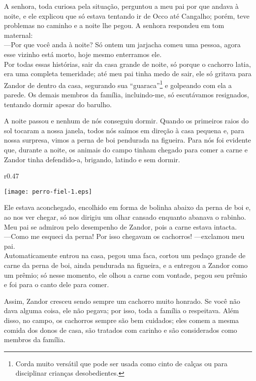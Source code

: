 A senhora, toda curiosa pela situação, perguntou a meu pai por que andava à noite, e ele explicou que só estava tentando ir de Occo até Cangalho; porém, teve problemas no caminho e a noite lhe pegou. 
A senhora respondeu em tom maternal:\\\indent 
---Por que você anda à noite? Só ontem um jarjacha comeu uma pessoa, agora esse vizinho está morto, hoje mesmo enterramos ele.\\\indent
Por todas essas histórias, sair da casa grande de noite, só porque o cachorro latia, era uma completa temeridade; até meu pai tinha medo de sair, ele só gritava para Zandor de dentro da casa, segurando sua ``guaraca''\footnote{Corda muito versátil que pode ser usada como cinto de calças ou para disciplinar crianças desobedientes.} e golpeando com ela a parede. 
Os demais membros da família, incluindo-me, só escutávamos resignados, tentando dormir apesar do barulho.

A noite passou e nenhum de nós conseguiu dormir. 
Quando os primeiros raios do sol tocaram a nossa janela, todos nós saímos em direção à casa pequena e, para nossa surpresa, vimos a perna de boi pendurada na figueira. 
Para nós foi evidente que, durante a noite, os animais do campo tinham chegado para comer a carne e Zandor tinha defendido-a, brigando, latindo e sem dormir.
\ifdefined\EnableIncludeImages 
\begin{wrapfigure}{r}{0.47\textwidth}
  \begin{center}
  \vspace{-0.5cm}
    \texttt{[image: perro-fiel-1.eps]}
  \end{center}
  \vspace{-0.5cm}
\end{wrapfigure}
\fi
Ele estava aconchegado, encolhido em forma de bolinha abaixo da perna de boi e, ao nos ver chegar, só nos dirigiu um olhar cansado enquanto abanava o rabinho. Meu pai se admirou pelo desempenho de Zandor, pois a carne estava intacta.\\\indent
---Como me esqueci da perna! Por isso chegavam os cachorros! ---exclamou meu pai.\\\indent
Automaticamente entrou na casa, pegou uma faca, cortou um pedaço grande de carne da perna de boi, ainda pendurada na figueira, e a entregou a Zandor como um prêmio; só nesse momento, ele olhou a carne com vontade, pegou seu prêmio e foi para o canto dele para comer.

Assim, Zandor cresceu sendo sempre um cachorro muito honrado. Se você não dava alguma coisa, ele não pegava; por isso, toda a família o respeitava. Além disso, no campo, os cachorros sempre são bem cuidados; eles comem a mesma comida dos donos de casa, são tratados com carinho e são considerados como membros da família.

